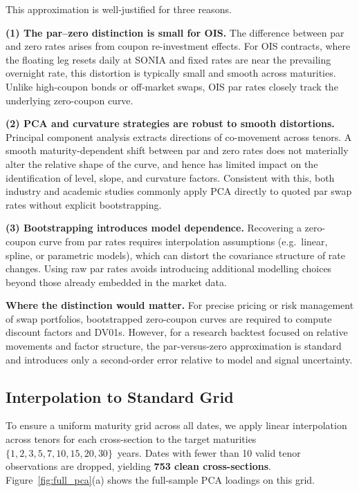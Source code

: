 \documentclass[11pt,a4paper]{article}
\begin{document}
This approximation is well-justified for three reasons.

\textbf{(1) The par--zero distinction is small for OIS.}
The difference between par and zero rates arises from coupon
re-investment effects.  For OIS contracts, where the floating leg
resets daily at SONIA and fixed rates are near the prevailing
overnight rate, this distortion is typically small and smooth across
maturities.  Unlike high-coupon bonds or off-market swaps, OIS par
rates closely track the underlying zero-coupon curve.

\textbf{(2) PCA and curvature strategies are robust to smooth distortions.}
Principal component analysis extracts directions of co-movement across
tenors.  A smooth maturity-dependent shift between par and zero rates
does not materially alter the relative shape of the curve, and hence
has limited impact on the identification of level, slope, and curvature
factors.  Consistent with this, both industry and academic studies
commonly apply PCA directly to quoted par swap rates without explicit
bootstrapping.

\textbf{(3) Bootstrapping introduces model dependence.}
Recovering a zero-coupon curve from par rates requires interpolation
assumptions (e.g.\ linear, spline, or parametric models), which can
distort the covariance structure of rate changes.  Using raw par rates
avoids introducing additional modelling choices beyond those already
embedded in the market data.

\textbf{Where the distinction would matter.}
For precise pricing or risk management of swap portfolios, bootstrapped
zero-coupon curves are required to compute discount factors and DV01s.
However, for a research backtest focused on relative movements and
factor structure, the par-versus-zero approximation is standard and
introduces only a second-order error relative to model and signal
uncertainty.

\subsection{Interpolation to Standard Grid}
To ensure a uniform maturity grid across all dates, we apply linear
interpolation across tenors for each cross-section to the target maturities
$\{1,2,3,5,7,10,15,20,30\}$~years.  Dates with fewer than 10 valid tenor
observations are dropped, yielding \textbf{753 clean cross-sections}.
Figure~\ref{fig:full_pca}(a) shows the full-sample PCA loadings on this grid.
\end{document}
